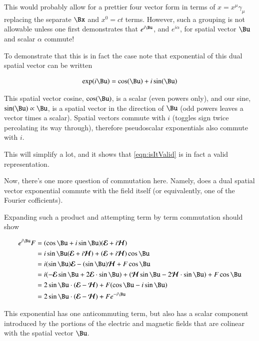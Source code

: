 \documentclass{article}
\newcommand{\EE}[0]{\boldsymbol{\mathcal{E}}}
\newcommand{\HH}[0]{\boldsymbol{\mathcal{H}}}
\begin{document}
This would probably allow for a prettier four vector form in terms of $x = x^\mu \gamma_\mu$ replacing the separate $\Bx$ and $x^0 = ct$ terms.
However, 
such a grouping is not allowable unless one first demonstrates that $e^{i \Bu }$, and $e^{i \alpha }$, for spatial vector $\Bu$ and scalar $\alpha$ commute!

To demonstrate that this is in fact the case 
note that exponential
of this dual spatial vector can be written

\begin{align*}
\exp( i \Bu ) &= \cos( \Bu ) + i \sin( \Bu ) \\
\end{align*}

This spatial vector cosine, $\cos(\Bu)$, is a scalar (even powers only), and our sine, $\sin(\Bu) \propto \Bu$, is a spatial vector in the direction of $\Bu$ (odd powers leaves a vector times a scalar).  Spatial vectors commute with $i$ (toggles sign twice percolating its way through), therefore pseudoscalar exponentials also commute with $i$.

This will simplify a lot, and it shows that \ref{eqn:isItValid} is in fact a valid representation.

Now, there's one more question of commutation here.  Namely, does a dual spatial vector exponential commute with the field itself
(or equivalently, one of the Fourier cofficients).

Expanding such a product and attempting term by term commutation should show

\begin{align*}
e^{i\Bu} F
&= (\cos \Bu + i\sin\Bu) (\EE + i\HH) \\
&= i\sin\Bu (\EE + i\HH) + (\EE + i\HH) \cos\Bu \\
&= i (\sin\Bu) \EE - (\sin\Bu) \HH + F \cos\Bu \\
&= i (-\EE \sin\Bu + 2 \EE \cdot \sin\Bu ) + (\HH \sin\Bu - 2 \HH \cdot \sin\Bu ) + F \cos\Bu \\
&= 2 \sin\Bu \cdot (\EE - \HH) + F (\cos\Bu -i\sin\Bu) \\
&= 2 \sin\Bu \cdot (\EE - \HH) + F e^{-i\Bu}
\end{align*}

This exponential has one anticommuting term, but also has a scalar component introduced by the portions of the electric
and magnetic fields that are colinear with the spatial vector $\Bu$.
\end{document}
